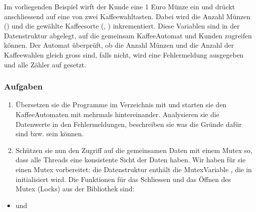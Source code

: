 \documentclass[a4paper,10pt,english]{report}
\begin{document}
\sphinxAtStartPar
Im vorliegenden Beispiel wirft der Kunde eine 1 Euro Münze ein und drückt anschliessend auf eine von zwei Kaffeewahltasten. Dabei wird die Anzahl Münzen () und die gewählte Kaffeesorte (, ) inkrementiert. Diese Variablen sind in der Datenstruktur  abgelegt, auf die gemeinsam Kaffee\sphinxhyphen{}Automat und Kunden zugreifen können. Der Auto\sphinxhyphen{}mat überprüft, ob die Anzahl Münzen und die Anzahl der Kaffeewahlen gleich gross sind, falls nicht, wird eine Fehlermeldung ausgegeben und alle Zähler auf  gesetzt.


\subsubsection{Aufgaben}
\label{\detokenize{P08_Sync/README:aufgaben}}\begin{enumerate}
%
\item {} 
\sphinxAtStartPar
Übersetzen sie die Programme im Verzeichnis  mit  und starten sie den Kaffee\sphinxhyphen{}Automaten mit  mehrmals hintereinander.
Analysieren sie die Datenwerte in den Fehlermeldungen, beschreiben sie was die Gründe dafür sind bzw. sein können.

\item {} 
\sphinxAtStartPar
Schützen sie nun den Zugriff auf die gemeinsamen Daten mit einem Mutex so, dass alle Threads eine konsistente Sicht der Daten haben.
Wir haben für sie einen Mutex vorbereitet: die Datenstruktur  enthält die Mutex\sphinxhyphen{}Variable , die in  initialisiert wird. Die Funktionen für das Schliessen und das Öffnen des Mutex (Locks) aus der  Bibliothek sind:

\end{enumerate}

\begin{sphinxVerbatim}[commandchars=\\\{\}]
  
\end{sphinxVerbatim}
\begin{itemize}
\item {} 
\sphinxAtStartPar
und

\end{itemize}
\end{document}
